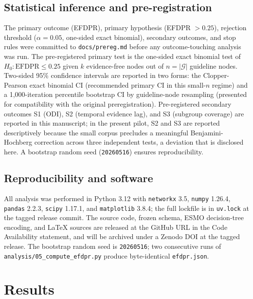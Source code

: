 \documentclass[11pt,a4paper]{article}
\begin{document}
\subsection{Statistical inference and pre-registration}
The primary outcome (EFDPR), primary hypothesis (EFDPR $> 0.25$), rejection threshold ($\alpha = 0.05$, one-sided exact binomial), secondary outcomes, and stop rules were committed to \texttt{docs/prereg.md} before any outcome-touching analysis was run. The pre-registered primary test is the one-sided exact binomial test of $H_0: \mathrm{EFDPR} \le 0.25$ given $k$ evidence-free nodes out of $n = |\mathcal{G}|$ guideline nodes. Two-sided 95\% confidence intervals are reported in two forms: the Clopper-Pearson exact binomial CI (recommended primary CI in this small-$n$ regime) and a 1,000-iteration percentile bootstrap CI by guideline-node resampling (presented for compatibility with the original preregistration). Pre-registered secondary outcomes S1 (ODI), S2 (temporal evidence lag), and S3 (subgroup coverage) are reported in this manuscript; in the present pilot, S2 and S3 are reported descriptively because the small corpus precludes a meaningful Benjamini-Hochberg correction across three independent tests, a deviation that is disclosed here. A bootstrap random seed (\texttt{20260516}) ensures reproducibility.

\subsection{Reproducibility and software}
All analysis was performed in Python 3.12 with \texttt{networkx} 3.5, \texttt{numpy} 1.26.4, \texttt{pandas} 2.2.3, \texttt{scipy} 1.17.1, and \texttt{matplotlib} 3.8.4; the full lockfile is in \texttt{uv.lock} at the tagged release commit. The source code, frozen schema, ESMO decision-tree encoding, and LaTeX sources are released at the GitHub URL in the Code Availability statement, and will be archived under a Zenodo DOI at the tagged release. The bootstrap random seed is \texttt{20260516}; two consecutive runs of \texttt{analysis/05\_compute\_efdpr.py} produce byte-identical \texttt{efdpr.json}.

\section{Results}\label{sec:results}
\end{document}
